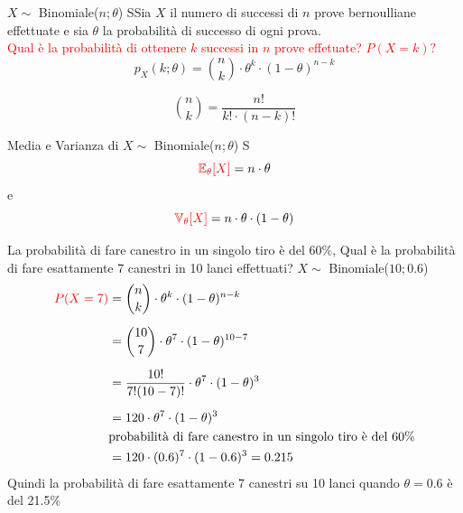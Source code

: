 \documentclass{article}  %
\theoremstyle{definition}
\begin{document}
\begin{theorem}{$X \sim$ Binomiale($n;\theta$) }
	SSia $X$ il numero di successi di $n$ prove bernoulliane effettuate e sia $\theta$ la probabilità di successo di ogni prova.
	\\
	\textcolor{red}{Qual è la probabilità di ottenere $k$ successi in $n$ prove effetuate? $P(X=k)?$}
	\[
		p_X(k;\theta)=\binom{n}{k} \cdot \theta^k \cdot (1-\theta)^{n-k}
	\]
\end{theorem}
\begin{osservazioni}[Osservazione]
	\[
		\binom{n}{k}=\frac{n!}{k! \cdot (n-k)!}
	\]
\end{osservazioni}
\begin{theorem}{Media e Varianza di $X \sim$ Binomiale($n;\theta$) }
	S\[
		\textcolor{red}{\mathbb{E}_{\theta}[X]}=n \cdot \theta
	\]
	e
	\[
		\textcolor{red}{\mathbb{V}_{\theta}[X]}=n \cdot \theta \cdot (1-\theta)
	\]
\end{theorem}
\begin{esercizio}[Esercizio]
	La probabilità di fare canestro in un singolo tiro è del 60$\%$, Qual è la probabilità di fare esattamente 7 canestri in 10 lanci effettuati? $X \sim$ Binomiale($10;0.6$)
	\begin{align*}
		\textcolor{red}{P(X=7)}
		 & = \binom{n}{k} \cdot \theta^k \cdot (1-\theta)^{n-k}                \\[2mm]
		 & = \binom{10}{7} \cdot \theta^7 \cdot (1-\theta)^{10-7}              \\[2mm]
		 & = \frac{10!}{7!(10-7)!} \cdot \theta^7 \cdot (1-\theta)^{3}         \\[2mm]
		 & = 120 \cdot \theta^7 \cdot (1-\theta)^{3}                           \\
		 & \text{probabilità di fare canestro in un singolo tiro è del 60$\%$} \\
		 & = 120 \cdot (0.6)^7 \cdot (1-0.6)^{3} = 0.215
	\end{align*}
	Quindi la probabilità di fare esattamente 7 canestri su 10 lanci quando $\theta=0.6$ è del 21.5$\%$
\end{esercizio}
\end{document}
